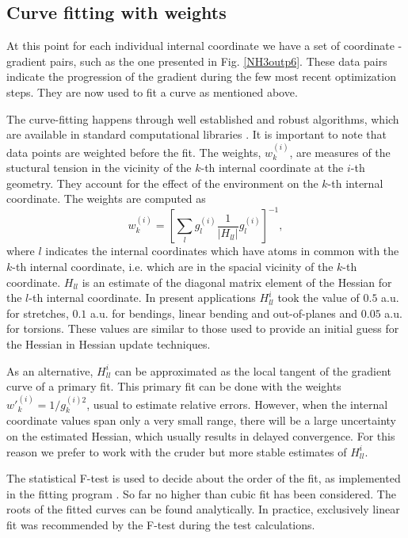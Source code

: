 \documentclass[prl,aps,twocolumn,showpacs,twocolumngrid,superbib]{revtex4}
\begin{document}
\subsection{Curve fitting with weights}
At this point for each individual internal coordinate we have a set of 
coordinate - gradient pairs, such as the one presented in 
Fig. \ref{NH3outp6}. These data pairs indicate the progression
of the gradient during the few most recent optimization steps.
They are now used to fit a curve as mentioned above.

The curve-fitting happens through 
well established and robust algorithms, which are available in standard 
computational libraries \cite{slatec}. 
It is important to note
that data points are weighted before the fit. The weights, 
$w_{k}^{(i)}$, are
measures of the stuctural tension in the vicinity of the $k$-th internal
coordinate at the $i$-th geometry. They account for the effect of the 
environment on the $k$-th internal coordinate. 
The weights are computed as
\begin{equation}
w_{k}^{(i)} = \left[ \sum_{l} g_{l}^{(i)} \frac{1}{|H_{ll}^{}|} g_{l}^{(i)} \right]^{-1} ,
\end{equation}
where $l$ indicates the internal coordinates which have atoms in common
with the $k$-th internal coordinate, i.e. which are in the spacial 
vicinity of the $k$-th coordinate. 
$H_{ll}^{}$ is an estimate
of the diagonal matrix element of the Hessian for the $l$-th 
internal coordinate. In present applications $H_{ll}^{i}$ took
the value of $0.5$ a.u. for stretches, $0.1$ a.u. 
for bendings, linear bending 
and out-of-planes and $0.05$ a.u. for torsions. These values are
similar to those used to provide an initial guess for the Hessian in
Hessian update techniques.

As an alternative, $H_{ll}^{i}$ can be approximated
as the local tangent of the gradient curve of a primary fit. 
This primary fit can be done with 
the weights $w{'}_{k}^{(i)} = 1/g_{k}^{(i)2}$, usual to 
estimate relative errors. However, when the internal coordinate values
span only a very small range, there will be a large uncertainty on the
estimated Hessian, which usually results in delayed convergence. 
For this reason we prefer to work with the cruder but more stable
estimates of $H_{ll}^{i}$. 

The statistical F-test is used to decide about the order of the fit,
as implemented in the fitting program \cite{slatec}.
So far no higher than cubic fit has been considered. The roots
of the fitted curves can be found analytically. In practice,
exclusively linear fit was recommended by the F-test during
the test calculations.
\end{document}
